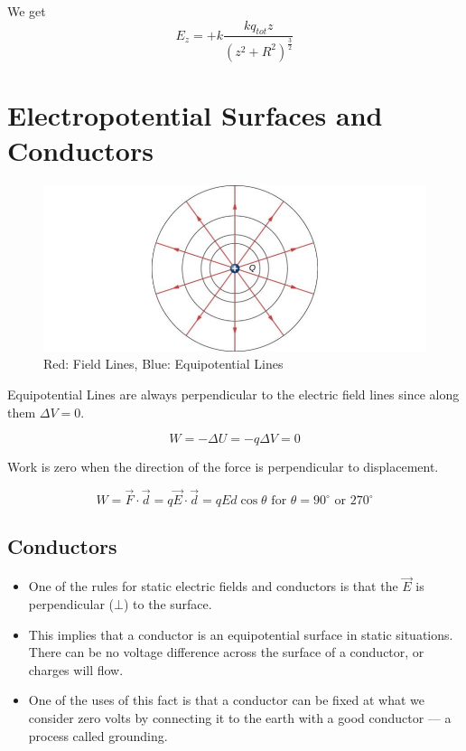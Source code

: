 \documentclass[14pt]{memoir}
\begin{document}
We get
\begin{equation}
E_z = +k \frac{k q_{tot} z}{(z^2+R^2)^{\frac{3}{2}}}
\end{equation}

\section{Electropotential Surfaces and Conductors}

\begin{figure}[H]
\begin{center}
\includegraphics[scale=0.50]{fig/fig_07_30.jpg}
\caption{Red: Field Lines, Blue: Equipotential Lines}
\label{fig:07_30}
\end{center}
\end{figure}

Equipotential Lines are always perpendicular to the electric field lines since along them $\Delta V = 0$.

\begin{equation}
W = -\Delta U = -q \Delta V = 0
\end{equation}

Work is zero when the direction of the force is perpendicular to displacement.

\begin{equation}
W = \vec{F} \cdot \vec{d} = q\vec{E} \cdot \vec{d} = qEd\cos{\theta} \text{ for } \theta = 90^{\circ} \text{ or } 270^{\circ}
\end{equation}


\subsection{Conductors}

\begin{itemize}
\item One of the rules for static electric fields and conductors is that the $\vec{E}$ is perpendicular ($\bot$) to the surface.
\item This implies that a conductor is an equipotential surface in static situations. There
can be no voltage difference across the surface of a conductor, or charges will flow. 
\item One of the uses of this fact is that a conductor can be fixed at what we consider zero volts by connecting it to the earth with a good conductor — a process called grounding.
\end{itemize}
\end{document}
